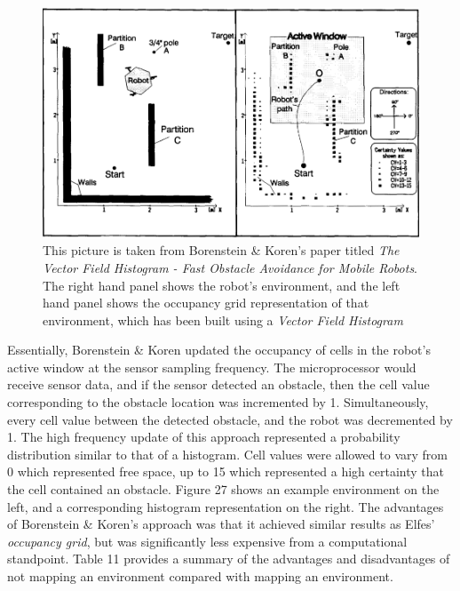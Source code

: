 \documentclass[a4paper]{article}
\begin{document}
\begin{figure}[h]
\centering
\includegraphics[scale=0.3]{vfh_occ_grid}
\caption{This picture is taken from Borenstein \& Koren's paper titled \textit{The Vector Field Histogram - Fast Obstacle Avoidance for Mobile Robots}. The right hand panel shows the robot's environment, and the left hand panel shows the occupancy grid representation of that environment, which has been built using a \textit{Vector Field Histogram}}
\end{figure}

Essentially, Borenstein \& Koren updated the occupancy of cells in the robot's active window at the sensor sampling frequency. The microprocessor would receive sensor data, and if the sensor detected an obstacle, then the cell value corresponding to the obstacle location was incremented by 1. Simultaneously, every cell value between the detected obstacle, and the robot was decremented by 1. The high frequency update of this approach represented a probability distribution similar to that of a histogram. Cell values were allowed to vary from 0 which represented free space, up to 15 which represented a high certainty that the cell contained an obstacle. Figure 27 shows an example environment on the left, and a corresponding histogram representation on the right. The advantages of Borenstein \& Koren's approach was that it achieved similar results as Elfes' \textit{occupancy grid}, but was significantly less expensive from a computational standpoint. Table 11 provides a summary of the advantages and disadvantages of not mapping an environment compared with mapping an environment.
\end{document}
